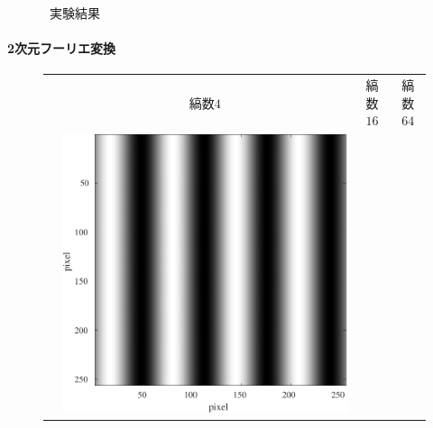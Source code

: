 \begin{figure}[H]
\begin{minipage}[b]{.23\textwidth}
    \end{minipage}
    \caption{\kadaibe\ 実験結果}
\end{figure}
\paragraph{2次元フーリエ変換}
\begin{figure}[H]
    \centering
    \renewcommand{\arraystretch}{1.3}
    \begin{tabularx}{\textwidth}{p{}CCC}
                                                                                                & {\small 縞数\(4\)} & {\small 縞数\(16\)} & {\small 縞数\(64\)} \\
        \begin{minipage}{.05\textwidth}
            \centering
        \end{minipage}                                                         &
        \begin{minipage}{.25\textwidth}
            \centering
            \includegraphics[width=.9\textwidth,keepaspectratio]{../../Figures/08_11_img4.pdf}
        \end{minipage}      &
        \begin{minipage}{.25\textwidth}
            \centering

\end{minipage}
\end{tabularx}
\end{figure}
